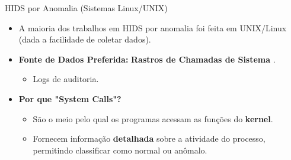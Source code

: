 \begin{frame}{HIDS por Anomalia (Sistemas Linux/UNIX)}
    \begin{itemize}
        \item A maioria dos trabalhos em HIDS por anomalia foi feita em UNIX/Linux (dada a facilidade de coletar dados).

        \item \textbf{Fonte de Dados Preferida:} \textbf{Rastros de Chamadas de Sistema} .
              \begin{itemize}
                  \item Logs de auditoria.
              \end{itemize}

        \item \textbf{Por que "System Calls"?}
              \begin{itemize}
                  \item São o meio pelo qual os programas acessam as funções do \textbf{kernel}.
                  \item Fornecem informação \textbf{detalhada} sobre a atividade do processo, permitindo classificar como normal ou anômalo.
              \end{itemize}

    \end{itemize}
\end{frame}

